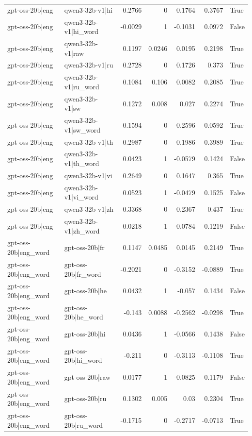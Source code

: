 \begin{table}
\begin{tabular}{l l r r r r l}
gpt-oss-20b|eng & qwen3-32b-v1|hi & 0.2766 & 0 & 0.1764 & 0.3767 & True \\
gpt-oss-20b|eng & qwen3-32b-v1|hi_word & -0.0029 & 1 & -0.1031 & 0.0972 & False \\
gpt-oss-20b|eng & qwen3-32b-v1|raw & 0.1197 & 0.0246 & 0.0195 & 0.2198 & True \\
gpt-oss-20b|eng & qwen3-32b-v1|ru & 0.2728 & 0 & 0.1726 & 0.373 & True \\
gpt-oss-20b|eng & qwen3-32b-v1|ru_word & 0.1084 & 0.106 & 0.0082 & 0.2085 & True \\
gpt-oss-20b|eng & qwen3-32b-v1|sw & 0.1272 & 0.008 & 0.027 & 0.2274 & True \\
gpt-oss-20b|eng & qwen3-32b-v1|sw_word & -0.1594 & 0 & -0.2596 & -0.0592 & True \\
gpt-oss-20b|eng & qwen3-32b-v1|th & 0.2987 & 0 & 0.1986 & 0.3989 & True \\
gpt-oss-20b|eng & qwen3-32b-v1|th_word & 0.0423 & 1 & -0.0579 & 0.1424 & False \\
gpt-oss-20b|eng & qwen3-32b-v1|vi & 0.2649 & 0 & 0.1647 & 0.365 & True \\
gpt-oss-20b|eng & qwen3-32b-v1|vi_word & 0.0523 & 1 & -0.0479 & 0.1525 & False \\
gpt-oss-20b|eng & qwen3-32b-v1|zh & 0.3368 & 0 & 0.2367 & 0.437 & True \\
gpt-oss-20b|eng & qwen3-32b-v1|zh_word & 0.0218 & 1 & -0.0784 & 0.1219 & False \\
gpt-oss-20b|eng_word & gpt-oss-20b|fr & 0.1147 & 0.0485 & 0.0145 & 0.2149 & True \\
gpt-oss-20b|eng_word & gpt-oss-20b|fr_word & -0.2021 & 0 & -0.3152 & -0.0889 & True \\
gpt-oss-20b|eng_word & gpt-oss-20b|he & 0.0432 & 1 & -0.057 & 0.1434 & False \\
gpt-oss-20b|eng_word & gpt-oss-20b|he_word & -0.143 & 0.0088 & -0.2562 & -0.0298 & True \\
gpt-oss-20b|eng_word & gpt-oss-20b|hi & 0.0436 & 1 & -0.0566 & 0.1438 & False \\
gpt-oss-20b|eng_word & gpt-oss-20b|hi_word & -0.211 & 0 & -0.3113 & -0.1108 & True \\
gpt-oss-20b|eng_word & gpt-oss-20b|raw & 0.0177 & 1 & -0.0825 & 0.1179 & False \\
gpt-oss-20b|eng_word & gpt-oss-20b|ru & 0.1302 & 0.005 & 0.03 & 0.2304 & True \\
gpt-oss-20b|eng_word & gpt-oss-20b|ru_word & -0.1715 & 0 & -0.2717 & -0.0713 & True \\

\end{tabular}
\end{table}
